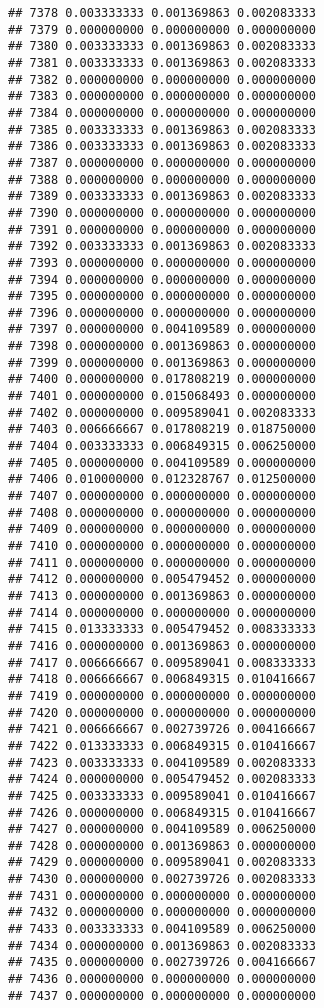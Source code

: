 \documentclass[
]{article}
\begin{document}
\begin{verbatim}
## 7378 0.003333333 0.001369863 0.002083333
## 7379 0.000000000 0.000000000 0.000000000
## 7380 0.003333333 0.001369863 0.002083333
## 7381 0.003333333 0.001369863 0.002083333
## 7382 0.000000000 0.000000000 0.000000000
## 7383 0.000000000 0.000000000 0.000000000
## 7384 0.000000000 0.000000000 0.000000000
## 7385 0.003333333 0.001369863 0.002083333
## 7386 0.003333333 0.001369863 0.002083333
## 7387 0.000000000 0.000000000 0.000000000
## 7388 0.000000000 0.000000000 0.000000000
## 7389 0.003333333 0.001369863 0.002083333
## 7390 0.000000000 0.000000000 0.000000000
## 7391 0.000000000 0.000000000 0.000000000
## 7392 0.003333333 0.001369863 0.002083333
## 7393 0.000000000 0.000000000 0.000000000
## 7394 0.000000000 0.000000000 0.000000000
## 7395 0.000000000 0.000000000 0.000000000
## 7396 0.000000000 0.000000000 0.000000000
## 7397 0.000000000 0.004109589 0.000000000
## 7398 0.000000000 0.001369863 0.000000000
## 7399 0.000000000 0.001369863 0.000000000
## 7400 0.000000000 0.017808219 0.000000000
## 7401 0.000000000 0.015068493 0.000000000
## 7402 0.000000000 0.009589041 0.002083333
## 7403 0.006666667 0.017808219 0.018750000
## 7404 0.003333333 0.006849315 0.006250000
## 7405 0.000000000 0.004109589 0.000000000
## 7406 0.010000000 0.012328767 0.012500000
## 7407 0.000000000 0.000000000 0.000000000
## 7408 0.000000000 0.000000000 0.000000000
## 7409 0.000000000 0.000000000 0.000000000
## 7410 0.000000000 0.000000000 0.000000000
## 7411 0.000000000 0.000000000 0.000000000
## 7412 0.000000000 0.005479452 0.000000000
## 7413 0.000000000 0.001369863 0.000000000
## 7414 0.000000000 0.000000000 0.000000000
## 7415 0.013333333 0.005479452 0.008333333
## 7416 0.000000000 0.001369863 0.000000000
## 7417 0.006666667 0.009589041 0.008333333
## 7418 0.006666667 0.006849315 0.010416667
## 7419 0.000000000 0.000000000 0.000000000
## 7420 0.000000000 0.000000000 0.000000000
## 7421 0.006666667 0.002739726 0.004166667
## 7422 0.013333333 0.006849315 0.010416667
## 7423 0.003333333 0.004109589 0.002083333
## 7424 0.000000000 0.005479452 0.002083333
## 7425 0.003333333 0.009589041 0.010416667
## 7426 0.000000000 0.006849315 0.010416667
## 7427 0.000000000 0.004109589 0.006250000
## 7428 0.000000000 0.001369863 0.000000000
## 7429 0.000000000 0.009589041 0.002083333
## 7430 0.000000000 0.002739726 0.002083333
## 7431 0.000000000 0.000000000 0.000000000
## 7432 0.000000000 0.000000000 0.000000000
## 7433 0.003333333 0.004109589 0.006250000
## 7434 0.000000000 0.001369863 0.002083333
## 7435 0.000000000 0.002739726 0.004166667
## 7436 0.000000000 0.000000000 0.000000000
## 7437 0.000000000 0.000000000 0.000000000

\end{verbatim}
\end{document}
